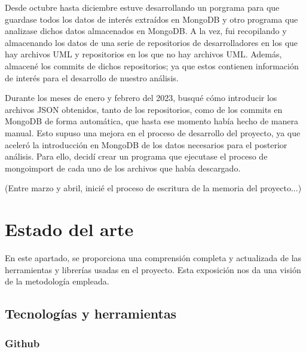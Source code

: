 \documentclass[a4paper, 12pt]{book}
\begin{document}
Desde octubre hasta diciembre estuve desarrollando un porgrama para que guardase todos los datos de interés extraídos en MongoDB y otro programa que analizase dichos datos almacenados en MongoDB.
A la vez, fui recopilando y almacenando los datos de una serie de repositorios de desarrolladores en los que hay archivos UML y repositorios en los que no hay archivos UML.
Además, almacené los commits de dichos repositorios; ya que estos contienen información de interés para el desarrollo de nuestro análisis.


Durante los meses de enero y febrero del 2023, busqué cómo introducir los archivos JSON obtenidos, tanto de los repositorios, como de los commits en MongoDB de forma automática, que hasta ese momento había hecho de manera manual.
Esto supuso una mejora en el proceso de desarrollo del proyecto, ya que aceleró la introducción en MongoDB de los datos necesarios para el posterior análisis.
Para ello, decidí crear un programa que ejecutase el proceso de mongoimport de cada uno de los archivos que había descargado. 


(Entre marzo y abril, inicié el proceso de escritura de la memoria del proyecto...)



\cleardoublepage
\chapter{Estado del arte}
\label{chap:estado}

En este apartado, se proporciona una comprensión completa y actualizada de las herramientas y librerías usadas en el proyecto.
Esta exposición nos da una visión de la metodología empleada.

\section{Tecnologías y herramientas} %
\label{sec:tecnologías y herramienta}

\subsection{Github} %
\label{sec:github} %
\end{document}
